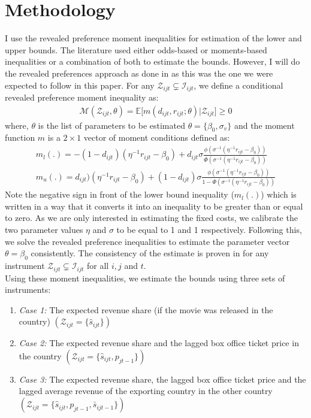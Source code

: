 \documentclass[11pt, letterpaper]{article} \usepackage{amsmath}
\begin{document}
\section{Methodology}
I use the revealed preference moment inequalities for estimation of
the lower and upper bounds. The literature used either odds-based or
moments-based inequalities or a combination of both to estimate the
bounds. However, I will do the revealed preferences approach as done
in \citep{pakes2015} as this was the one we were expected to follow in
this paper. For any $\mathcal{Z}_{ijt} \subsetneq \mathcal{I}_{ijt}$,
we define a conditional revealed preference moment inequality as:
\begin{align*}
  \mathcal{M}(\mathcal{Z}_{ijt}, \theta) = \mathbb{E}\bigg[ m(d_{ijt},
  r_{ijt}; \theta) \bigg| \mathcal{Z}_{ijt} \bigg] \geq 0
\end{align*}
where, $\theta$ is the list of parameters to be estimated
$\theta = \{\beta_0, \sigma_{v}\}$ and the moment function $m$ is a
$2 \times 1$ vector of moment conditions defined as:
\begin{align*}
  m_l(.) = -(1-d_{ijt})(\eta^{-1}r_{ijt} - \beta_0) + d_{ijt} \sigma
  \frac{\phi(\sigma^{-1}(\eta^{-1}r_{ijt} -
  \beta_0))}{\Phi(\sigma^{-1}(\eta^{-1}r_{ijt} -\beta_0))}\\
  m_u(.) = d_{ijt})(\eta^{-1}r_{ijt} - \beta_0) + (1-d_{ijt}) \sigma
  \frac{\phi(\sigma^{-1}(\eta^{-1}r_{ijt} -
  \beta_0))}{1-\Phi(\sigma^{-1}(\eta^{-1}r_{ijt} -\beta_0))}
\end{align*}
Note the negative sign in front of the lower bound inequality
($m_l(.)$) which is written in a way that it converts it into an
inequality to be greater than or equal to zero. As we are only
interested in estimating the fixed costs, we calibrate the two
parameter values $\eta$ and $\sigma$ to be equal to 1 and 1
respectively. Following this, we solve the revealed preference
inequalities to estimate the parameter vector $\theta = \beta_0$
consistently. The consistency of the estimate is proven in
\citet{dickstein2018} for any instrument
$\mathcal{Z}_{ijt} \subsetneq \mathcal{I}_{ijt}$ for all $i,j$ and
$t$.\\
Using these moment inequalities, we estimate the bounds using three
sets of instruments:
\begin{enumerate}
\item \textit{Case 1:} The expected revenue share (if the movie was released in the
  country) $(\mathcal{Z}_{ijt} = \{\hat s_{ijt}\})$
\item \textit{Case 2:} The expected revenue share and the lagged box office ticket
  price in the country
  $(\mathcal{Z}_{ijt} = \{ \hat s_{ijt}, p_{jt-1}\})$
\item \textit{Case 3:} The expected revenue share, the lagged box
  office ticket price and the lagged average revenue of the exporting
  country in the other country
  $(\mathcal{Z}_{ijt} = \{\hat s_{ijt}, p_{jt-1}, \bar s_{ijt-1}\})$
\end{enumerate}
\end{document}
